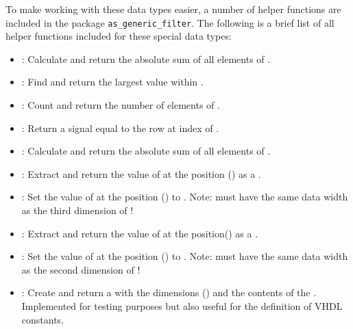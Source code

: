To make working with these data types easier, a number of helper functions are included in the package \texttt{as\_generic\_filter}.
The following is a brief list of all helper functions included for these special data types:
\begin{itemize}
\item {}: Calculate and return the absolute sum of all elements of .
\item {}: Find and return the largest value within .
\item {}: Count and return the number of elements of .
\item {}: Return a  signal equal to the row at index  of .
\item {}: Calculate and return the absolute sum of all elements of .
\item {}: Extract and return the value of  at the position () as a .
\item {}: Set the value of  at the position () to . Note:  must have the same data width as the third dimension of !
\item {}: Extract and return the value of  at the position() as a .
\item {}:  Set the value of  at the position () to . Note:  must have the same data width as the second dimension of !
\item {}: Create and return a  with the dimensions () and the contents of the . Implemented for testing purposes but also useful for the definition of VHDL constants.

\end{itemize}

